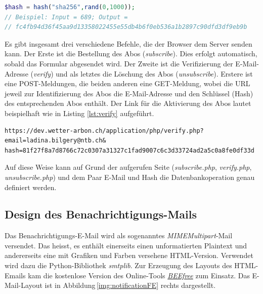 \vspace{3mm}
\begin{lstlisting}[label=lst:randomHash,caption=Funktion zur Erzeugung des eindeutigen Hash, language=php, style=php]
$hash = hash("sha256",rand(0,1000));
// Beispiel: Input = 689; Output =
// fc4fb94d36f45aa9d13358022455e55db4b6f0eb536a1b2897c90dfd3df9eb9b

\end{lstlisting}
\vspace{3mm}

\noindent
Es gibt insgesamt drei verschiedene Befehle, die der Browser dem Server senden kann. Der Erste ist die Bestellung des Abos (\textit{subscribe}). Dies erfolgt automatisch, sobald das Formular abgesendet wird. Der Zweite ist die Verifizierung der E-Mail-Adresse (\textit{verify}) und als letztes die Löschung des Abos (\textit{unsubscribe}). Erstere ist eine POST-Meldungen, die beiden anderen eine GET-Meldung, wobei die URL jeweil zur Identifizierung des Abos die E-Mail-Adresse und den Schlüssel (Hash) des entsprechenden Abos enthält. Der Link für die Aktivierung des Abos lautet beispielhaft wie in Listing \ref{lst:verify} aufgeführt.

\vspace{3mm}
\begin{lstlisting}[label=lst:verify,caption=Beispiellink für die Aktivierung eines Abos, language=HTML5, style=htmlcssjs]
https://dev.wetter-arbon.ch/application/php/verify.php?
email=ladina.bilgery@ntb.ch&
hash=81f27f8a7d8766c72c0307a31327c1fad9007c6c3d33724ad2a5c0a8fe0df33d
\end{lstlisting}
\vspace{3mm}

\noindent
Auf diese Weise kann auf Grund der aufgerufen Seite (\textit{subscribe.php}, \textit{verify.php}, \textit{unsubscribe.php}) und dem Paar E-Mail und Hash die Datenbankoperation genau definiert werden.

\subsection{Design des Benachrichtigungs-Mails}
Das Benachrichtigungs-E-Mail wird als sogenanntes \emph{MIMEMultipart}-Mail versendet. Das heisst, es enthält einerseits einen unformatierten Plaintext und andererseits eine mit Grafiken und Farben versehene HTML-Version. Verwendet wird dazu die Python-Bibliothek \emph{smtplib}. Zur Erzeugung des Layouts des HTML-Emails kam die kostenlose Version des Online-Tools \emph{\href{https://beefree.io/bee-free/}{BEEfree}} zum Einsatz. Das E-Mail-Layout ist in Abbildung\,\ref{img:notificationFE} rechts dargestellt.




